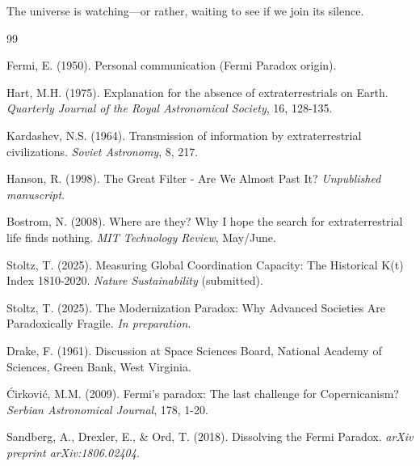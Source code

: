 \documentclass[11pt,a4paper]{article}
\begin{document}
The universe is watching---or rather, waiting to see if we join its silence.


\begin{thebibliography}{99}

Fermi, E. (1950). Personal communication (Fermi Paradox origin).

Hart, M.H. (1975). Explanation for the absence of extraterrestrials on Earth. \textit{Quarterly Journal of the Royal Astronomical Society}, 16, 128-135.

Kardashev, N.S. (1964). Transmission of information by extraterrestrial civilizations. \textit{Soviet Astronomy}, 8, 217.

Hanson, R. (1998). The Great Filter - Are We Almost Past It? \textit{Unpublished manuscript}.

Bostrom, N. (2008). Where are they? Why I hope the search for extraterrestrial life finds nothing. \textit{MIT Technology Review}, May/June.

Stoltz, T. (2025). Measuring Global Coordination Capacity: The Historical K(t) Index 1810-2020. \textit{Nature Sustainability} (submitted).

Stoltz, T. (2025). The Modernization Paradox: Why Advanced Societies Are Paradoxically Fragile. \textit{In preparation}.

Drake, F. (1961). Discussion at Space Sciences Board, National Academy of Sciences, Green Bank, West Virginia.

\'Cirkovi\'c, M.M. (2009). Fermi's paradox: The last challenge for Copernicanism? \textit{Serbian Astronomical Journal}, 178, 1-20.

Sandberg, A., Drexler, E., \& Ord, T. (2018). Dissolving the Fermi Paradox. \textit{arXiv preprint arXiv:1806.02404}.

\end{thebibliography}
\end{document}
